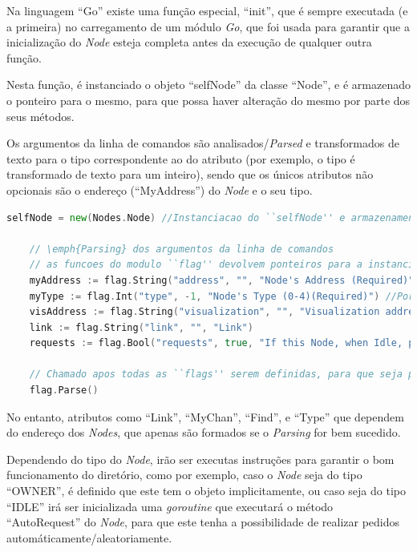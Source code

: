 Na linguagem ``Go'' existe uma função especial, ``init'', que é sempre executada (e a primeira) no carregamento de um módulo \emph{Go},
que foi usada para garantir que a inicialização do \emph{Node} esteja completa antes da execução de qualquer outra função.



Nesta função, é instanciado o objeto ``selfNode'' da classe ``Node'', e é armazenado o ponteiro para o mesmo, para que possa haver alteração do mesmo
por parte dos seus métodos.

Os argumentos da linha de comandos são analisados/\emph{Parsed} e transformados de texto para o tipo
correspondente ao do atributo (por exemplo, o tipo é transformado de texto para um inteiro), sendo que 
os únicos atributos não opcionais são o endereço (``MyAddress'') do \emph{Node} e o seu tipo.


\begin{lstlisting}[caption={\emph{Parsing} dos argumentos da linha de comandos.},language=Go]
	selfNode = new(Nodes.Node) //Instanciacao do ``selfNode'' e armazenamento do ponteiro para o mesmo

	// \emph{Parsing} dos argumentos da linha de comandos
	// as funcoes do modulo ``flag'' devolvem ponteiros para a instanciacao de cada argumento \emph{Parsed}
	myAddress := flag.String("address", "", "Node's Address (Required)")
	myType := flag.Int("type", -1, "Node's Type (0-4)(Required)") //Por definicao de todos os tipos
	visAddress := flag.String("visualization", "", "Visualization address.")
	link := flag.String("link", "", "Link")
	requests := flag.Bool("requests", true, "If this Node, when Idle, preforms Object Requests")

	// Chamado apos todas as ``flags'' serem definidas, para que seja processado o \emph{Parsing}
	flag.Parse()

\end{lstlisting}

No entanto, atributos como ``Link'', ``MyChan'', ``Find'', e ``Type'' que dependem do endereço dos \emph{Nodes},
que apenas são formados se o \emph{Parsing} for bem sucedido.

Dependendo do tipo do \emph{Node}, irão ser executas instruções para garantir o bom funcionamento do diretório,
como por exemplo, caso o \emph{Node} seja do tipo ``OWNER'', é definido que este tem o objeto implicitamente, ou
caso seja do tipo ``IDLE'' irá ser inicializada uma \emph{goroutine} que executará o método ``AutoRequest'' do \emph{Node},
para que este tenha a possibilidade de realizar pedidos automáticamente/aleatoriamente.

